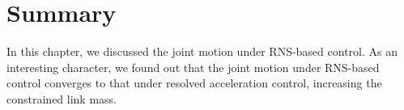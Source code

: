 


\section{Summary}
In this chapter,
we discussed the joint motion under RNS-based control.
As an interesting character,
we found out that the joint motion under RNS-based control converges to
that under resolved acceleration control, increasing the constrained link mass.

